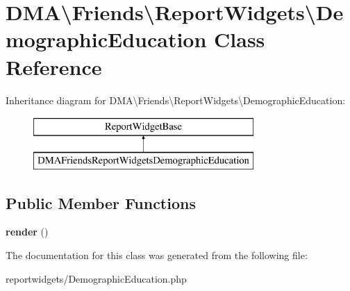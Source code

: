\hypertarget{classDMA_1_1Friends_1_1ReportWidgets_1_1DemographicEducation}{}\section{D\+M\+A\textbackslash{}Friends\textbackslash{}Report\+Widgets\textbackslash{}Demographic\+Education Class Reference}
\label{classDMA_1_1Friends_1_1ReportWidgets_1_1DemographicEducation}
Inheritance diagram for D\+M\+A\textbackslash{}Friends\textbackslash{}Report\+Widgets\textbackslash{}Demographic\+Education\+:\begin{figure}[H]
\begin{center}
\leavevmode
\includegraphics[height=2.000000cm]{d2/d47/classDMA_1_1Friends_1_1ReportWidgets_1_1DemographicEducation}
\end{center}
\end{figure}
\subsection*{Public Member Functions}
\begin{DoxyCompactItemize}
\item 
\hypertarget{classDMA_1_1Friends_1_1ReportWidgets_1_1DemographicEducation_a896a6c415537a16f72ac2f068b8ed226}{}{\bfseries render} ()\label{classDMA_1_1Friends_1_1ReportWidgets_1_1DemographicEducation_a896a6c415537a16f72ac2f068b8ed226}

\end{DoxyCompactItemize}


The documentation for this class was generated from the following file\+:\begin{DoxyCompactItemize}
\item 
reportwidgets/Demographic\+Education.\+php\end{DoxyCompactItemize}
